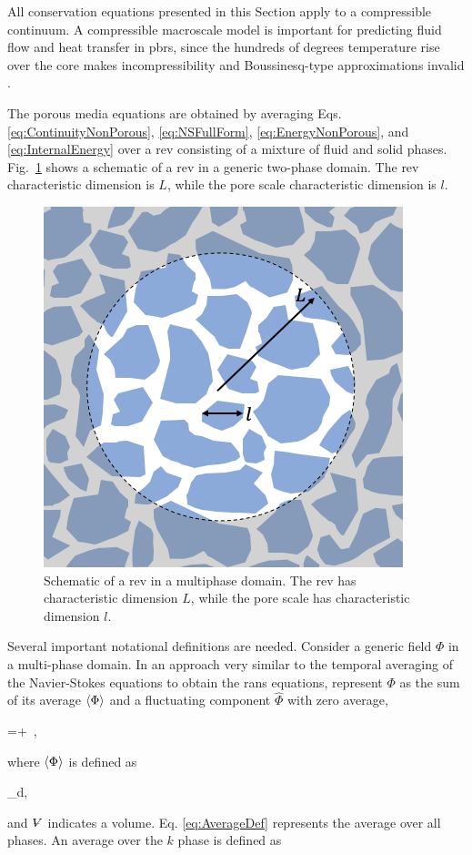 All conservation equations presented in this Section apply to a compressible continuum. A compressible macroscale model is important for predicting fluid flow and heat transfer in \glspl{pbr}, since the hundreds of degrees temperature rise over the core makes incompressibility and Boussinesq-type approximations invalid \cite{elmo}. 

The porous media equations are obtained by averaging Eqs. \eqref{eq:ContinuityNonPorous}, \eqref{eq:NSFullForm}, \eqref{eq:EnergyNonPorous}, and \eqref{eq:InternalEnergy} over a \gls{rev} consisting of a mixture of fluid and solid phases. Fig.\ \ref{fig:rev} shows a schematic of a \gls{rev} in a generic two-phase domain. The \gls{rev} characteristic dimension is \(L\), while the pore scale characteristic dimension is \(l\).

\begin{figure}[!h]
\centering
\includegraphics[width=0.4\linewidth]{figs/rev.png}
\caption{Schematic of a \gls{rev} in a multiphase domain. The \gls{rev} has characteristic dimension \(L\), while the pore scale has characteristic dimension \(l\).}
\label{fig:rev}
\end{figure}

\noindent Several important notational definitions are needed. Consider a generic field \(\Phi\) in a multi-phase domain. In an approach very similar to the temporal averaging of the Navier-Stokes equations to obtain the \gls{rans} equations, represent \(\Phi\) as the sum of its average \(\langle\Phi\rangle\) and a fluctuating component \(\hat{\Phi}\) with zero average,

\beq
\label{eq:PM_back}
\Phi=\la\Phi\ra+\hat{\Phi}\ ,
\eeq

\noindent where \(\langle\Phi\rangle\) is defined as

\beq
\label{eq:AverageDef}
\la\Phi\ra\equiv{}\int_{\volume}\Phi d\volume ,
\eeq

\noindent and \(\volume\) indicates a volume. Eq. \eqref{eq:AverageDef} represents the average over all phases. An average over the \(k\) phase is defined as

